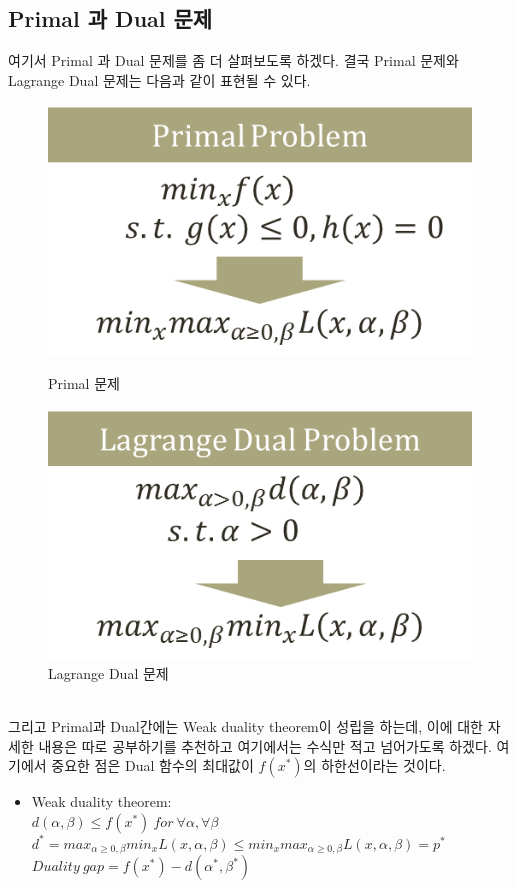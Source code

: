 \documentclass[a4paper]{oblivoir}
\begin{document}
\subsection{Primal 과 Dual 문제}
\indent 여기서 Primal 과 Dual 문제를 좀 더 살펴보도록 하겠다. 결국 Primal 문제와 Lagrange Dual 문제는 다음과 같이 표현될 수 있다.\\
\begin{figure}[ht]\centering
\parbox[t]{4cm}{\includegraphics[scale=0.5]{Primal}\caption{Primal 문제}\label{Fig:5-19}}\hspace{2cm}
\parbox[t]{4.5cm}{\includegraphics[scale=0.5]{Dual}\caption{Lagrange Dual 문제}\label{Fig:5-20}}
\end{figure}\\
그리고 Primal과 Dual간에는 Weak duality theorem이 성립을 하는데, 이에 대한 자세한 내용은 따로 공부하기를 추천하고 여기에서는 수식만 적고 넘어가도록 하겠다. 여기에서 중요한 점은 Dual 함수의 최대값이 $f(x^*)$의 하한선이라는 것이다.
\begin{itemize}\setlength\itemsep{-\parsep}
	\item Weak duality theorem:\\
	$d(\alpha,\beta)\leq f(x^*)\ for\ \forall\alpha,\forall\beta$\\
	$d^*=max_{\alpha\geq 0, \beta}min_{x} L(x,\alpha,\beta)\leq min_x max_{\alpha\geq 0, \beta} L(x,\alpha,\beta)=p^*$\\
	$Duality\ gap=f(x^*)-d(\alpha^*,\beta^*)$\\
\end{itemize}
\end{document}
